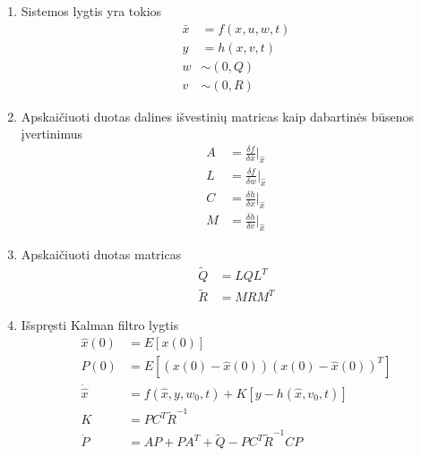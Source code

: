         \begin{enumerate}
            \item Sistemos lygtis yra tokios
            \begin{equation}
                \begin{aligned}
                \bar{x} &= f(x, u, w, t) \\
                y &= h(x, v, t) \\
                w &\sim (0,Q) \\
                v &\sim (0, R)
                \end{aligned}
            \end{equation}
            \item Apskaičiuoti duotas dalines išvestinių matricas kaip dabartinės būsenos įvertinimus
            \begin{equation}
                \begin{aligned}
                    A &= \frac{\delta f}{\delta x}\Bigr|_{\hat{x}} \\
                    L &= \frac{\delta f}{\delta w}\Bigr|_{\hat{x}} \\
                    C &= \frac{\delta h}{\delta x}\Bigr|_{\hat{x}} \\
                    M &= \frac{\delta h}{\delta v}\Bigr|_{\hat{x}}
                \end{aligned}
            \end{equation}
            \item Apskaičiuoti duotas matricas
            \begin{equation}
                \label{eq:ekf_q_r}
                \begin{aligned}
                    \tilde{Q} &= LQL^T \\
                    \tilde{R} &= MRM^T
                \end{aligned}
            \end{equation}
            \item Išspręsti Kalman filtro lygtis
            \begin{equation}
                \label{eq:ekf}
                \begin{aligned}
                    \hat{x}(0) &= E[x(0)]  \\
                    P(0) &= E[ (x(0) - \hat{x}(0))(x(0) - \hat{x}(0))^T ] \\
                    \dot{\hat{x}} &= f(\hat{x}, y, w_0, t) + K[y - h(\hat{x}, v_0, t)] \\
                    K &= PC^T\tilde{R}^{-1} \\
                    \dot{P} &= AP + PA^T + \tilde{Q} - PC^T\tilde{R}^{-1}CP
                \end{aligned}
            \end{equation}
        \end{enumerate}

